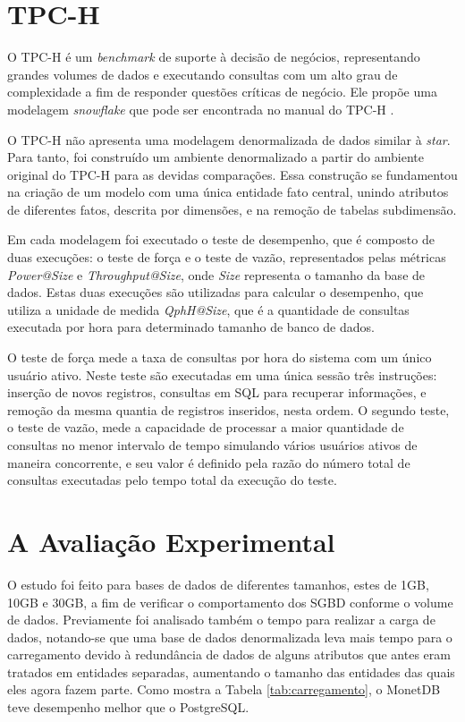 \documentclass[12pt]{article}
\begin{document}
\section{TPC-H}
O TPC-H é um \textit{benchmark} de suporte à decisão de negócios, representando grandes volumes de dados e executando 
consultas com um alto grau de complexidade a fim de responder questões críticas de negócio. Ele propõe 
uma modelagem \textit{snowflake} que pode ser encontrada no manual do TPC-H \cite{tpc2017specs}.

O TPC-H não apresenta uma modelagem denormalizada de dados similar à \textit{star}. Para tanto, foi construído 
um ambiente denormalizado a partir do ambiente original do TPC-H para as devidas comparações. 
Essa construção se fundamentou na criação de um modelo com 
uma única entidade fato central, unindo atributos de diferentes fatos, descrita por dimensões, e 
na remoção de tabelas subdimensão.

Em cada modelagem foi executado o teste de desempenho, que é composto de duas execuções: 
o teste de força e o teste de vazão, representados pelas métricas \textit{Power@Size} e \textit{Throughput@Size}, 
onde \textit{Size} representa o tamanho da base de dados. Estas duas execuções são utilizadas para calcular o 
desempenho, que utiliza a unidade de medida \textit{QphH@Size}, que é a quantidade 
de consultas executada por hora para determinado tamanho de banco de dados.

O teste de força mede a taxa de consultas por hora do sistema com um único usuário ativo. 
Neste teste são executadas em uma única sessão três instruções: inserção de novos registros, consultas 
em SQL para recuperar informações, e remoção da mesma quantia de registros inseridos, nesta ordem. O 
segundo teste, o teste de vazão, mede a capacidade de processar a maior quantidade de consultas no menor 
intervalo de tempo simulando vários usuários ativos de maneira concorrente, 
e seu valor é definido pela razão do número total de consultas executadas pelo 
tempo total da execução do teste. 

\section{A Avaliação Experimental}

O estudo foi feito para bases de dados de diferentes tamanhos, estes de 1GB, 10GB e 30GB, a fim de 
verificar o comportamento dos SGBD conforme o volume de dados. Previamente foi analisado 
também o tempo para realizar a carga de dados, notando-se que uma base de dados 
denormalizada leva mais tempo para o carregamento devido à redundância de dados de alguns atributos que 
antes eram tratados em entidades separadas, aumentando o tamanho das entidades das quais eles agora fazem parte. 
Como mostra a Tabela \ref{tab:carregamento}, o MonetDB teve desempenho melhor que o PostgreSQL. 
\end{document}
